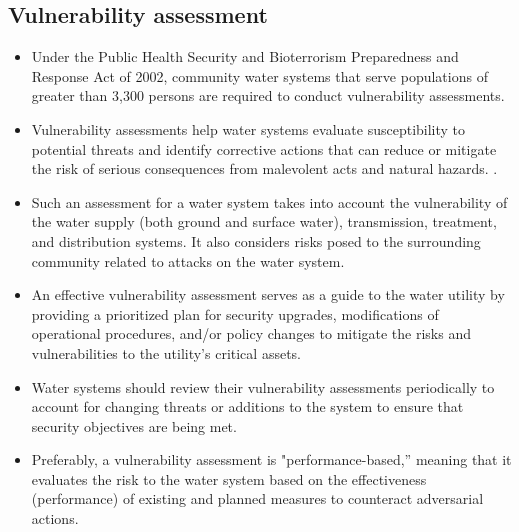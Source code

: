 \subsection{Vulnerability assessment} 
\begin{itemize}
\item Under the Public Health Security and Bioterrorism Preparedness and Response Act of 2002,  community water systems that serve populations of greater than 3,300 persons are required to conduct vulnerability assessments.

\item Vulnerability assessments help water systems evaluate susceptibility to potential threats
and identify corrective actions that can reduce or mitigate the risk of serious consequences from
malevolent acts and natural hazards. 
. 

\item Such an assessment for a water system takes into account the vulnerability of the water supply (both ground and surface water), transmission, treatment, and distribution systems. It also considers risks posed to the surrounding community related to attacks on the water system. 

\item An effective vulnerability assessment serves as a guide to the water utility by providing a prioritized plan for security upgrades, modifications of operational procedures, and/or policy changes to mitigate the risks and vulnerabilities to the utility’s critical assets. 

\item Water systems should review their vulnerability assessments periodically to account for changing threats or additions to the system to ensure that security objectives are being met. 


\item Preferably, a vulnerability assessment is "performance-based,” meaning that it evaluates the risk to the water system based on the effectiveness (performance) of existing and planned measures to counteract adversarial actions.
\end{itemize}

